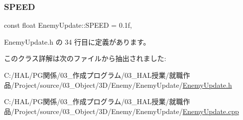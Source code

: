 \subsubsection{\texorpdfstring{S\+P\+E\+ED}{SPEED}}
{\footnotesize\ttfamily const float Enemy\+Update\+::\+S\+P\+E\+ED = 0.\+1f\hspace{0.3cm}{\ttfamily [static]}, {\ttfamily [private]}}



 Enemy\+Update.\+h の 34 行目に定義があります。



このクラス詳解は次のファイルから抽出されました\+:\begin{DoxyCompactItemize}
\item 
C\+:/\+H\+A\+L/\+P\+G関係/03\+\_\+作成プログラム/03\+\_\+\+H\+A\+L授業/就職作品/\+Project/source/03\+\_\+\+Object/3\+D/\+Enemy/\+Enemy\+Update/\mbox{\hyperlink{_enemy_update_8h}{Enemy\+Update.\+h}}\item 
C\+:/\+H\+A\+L/\+P\+G関係/03\+\_\+作成プログラム/03\+\_\+\+H\+A\+L授業/就職作品/\+Project/source/03\+\_\+\+Object/3\+D/\+Enemy/\+Enemy\+Update/\mbox{\hyperlink{_enemy_update_8cpp}{Enemy\+Update.\+cpp}}\end{DoxyCompactItemize}

